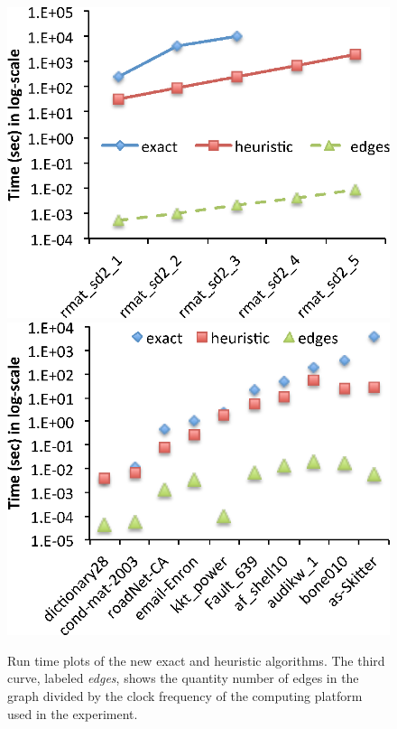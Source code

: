 \begin{figure}
    \includegraphics[scale=0.6]{compare_time_sd2.eps}
    \includegraphics[scale=0.6]{compare_time_rw.eps}
    
 \caption{Run time plots of the new exact and heuristic algorithms. The third curve, labeled
 {\em edges}, shows the quantity number of edges in the graph divided by the clock 
 frequency of the computing platform used in the experiment. 
 }
\label{fig-runtimeplots}
\end{figure}




